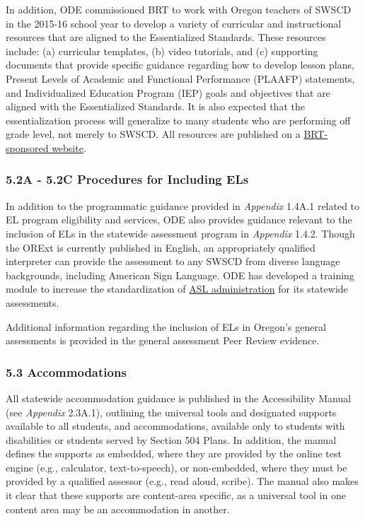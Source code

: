 \documentclass[]{article}
\begin{document}
In addition, ODE commissioned BRT to work with Oregon teachers of SWSCD
in the 2015-16 school year to develop a variety of curricular and
instructional resources that are aligned to the Essentialized Standards.
These resources include: (a) curricular templates, (b) video tutorials,
and (c) supporting documents that provide specific guidance regarding
how to develop lesson plans, Present Levels of Academic and Functional
Performance (PLAAFP) statements, and Individualized Education Program
(IEP) goals and objectives that are aligned with the Essentialized
Standards. It is also expected that the essentialization process will
generalize to many students who are performing off grade level, not
merely to SWSCD. All resources are published on a
\color{link}\href{http://lms.brtprojects.org}{BRT-sponsored
website}\color{black}.

\hypertarget{a---5.2c-procedures-for-including-els}{%
\subsubsection{5.2A - 5.2C Procedures for Including
ELs}\label{a---5.2c-procedures-for-including-els}}

In addition to the programmatic guidance provided in \emph{Appendix}
1.4A.1 related to EL program eligibility and services, ODE also provides
guidance relevant to the inclusion of ELs in the statewide assessment
program in \emph{Appendix} 1.4.2. Though the ORExt is currently
published in English, an appropriately qualified interpreter can provide
the assessment to any SWSCD from diverse language backgrounds, including
American Sign Language. ODE has developed a training module to increase
the standardization of \color{link}\href{http://lms.brtprojects.org}{ASL
administration} \color{black} for its statewide assessments.

Additional information regarding the inclusion of ELs in Oregon's
general assessments is provided in the general assessment Peer Review
evidence.

\hypertarget{accommodations}{%
\subsubsection{5.3 Accommodations}\label{accommodations}}

All statewide accommodation guidance is published in the Accessibility
Manual (see \emph{Appendix} 2.3A.1), outlining the universal tools and
designated supports available to all students, and accommodations,
available only to students with disabilities or students served by
Section 504 Plans. In addition, the manual defines the supports as
embedded, where they are provided by the online test engine (e.g.,
calculator, text-to-speech), or non-embedded, where they must be
provided by a qualified assessor (e.g., read aloud, scribe). The manual
also makes it clear that these supports are content-area specific, as a
universal tool in one content area may be an accommodation in another.
\end{document}
